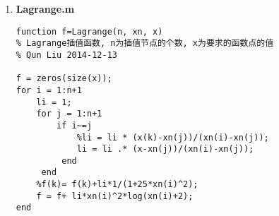 \documentclass[a4paper]{article}
\begin{document}
\begin{spacing}{1.5}
\begin{CJK*}{GBK}{song}
\begin{scriptsize}
\begin{enumerate}[(1)]
\begin{lstlisting}
%% 误差
% 绝对误差
figure,
set(gcf,'outerposition',get(0,'screensize'));
plot(xx, abs([f-y1;f-y2;f-y3]),'LineWidth',2)
h = legend('$|f(x)-P_3(x)|$', '$|f(x)-S_3^*(x)|$','$|f(x)-\tilde{L}_3(x)|$');
set(h, 'Interpreter','Latex','FontSize',14,'FontWeight','bold','Box','off','Location','Best')
title('The absolute error between different methods','FontSize',14,'FontWeight','bold');
hx = xlabel('$x$');
hy = ylabel('$y$');
set([hx,hy], 'Interpreter','Latex','FontSize',14,'FontWeight','bold')
set(gcf, 'PaperPositionMode', 'auto')   % Use screen size
% 打印图片
print -djpeg  -r300  approxabserror.jpeg;
\end{lstlisting}


\item \textbf{Lagrange.m} \\
\begin{lstlisting}
function f=Lagrange(n, xn, x)
% Lagrange插值函数, n为插值节点的个数, x为要求的函数点的值
% Qun Liu 2014-12-13

f = zeros(size(x));
for i = 1:n+1
    li = 1;
    for j = 1:n+1
        if i~=j
            %li = li * (x(k)-xn(j))/(xn(i)-xn(j));
            li = li .* (x-xn(j))/(xn(i)-xn(j));
         end
     end
    %f(k)= f(k)+li*1/(1+25*xn(i)^2);
    f = f+ li*xn(i)^2*log(xn(i)+2);
end
\end{lstlisting}
\end{enumerate}
\end{scriptsize}


\end{CJK*}
\end{spacing}
\end{document}
